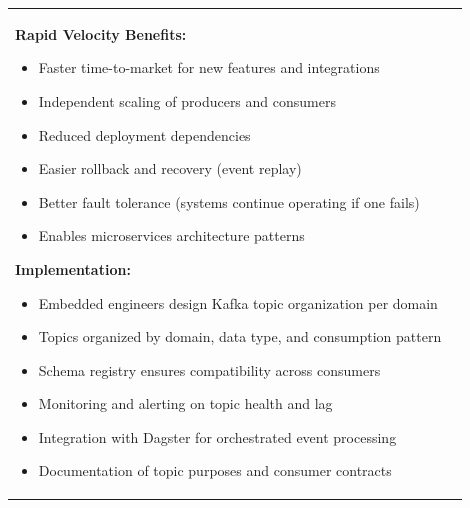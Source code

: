 \documentclass[10pt, a4paper]{article}
\begin{document}
{\begin{tabular}[t]{@{}p{}@{\hspace{0.02\textwidth}}p{}@{}}
\vspace{0.1em}

\textbf{Rapid Velocity Benefits:}
\begin{itemize}[leftmargin=1em, itemsep=0.05em]
    \item Faster time-to-market for new features and integrations
    \item Independent scaling of producers and consumers
    \item Reduced deployment dependencies
    \item Easier rollback and recovery (event replay)
    \item Better fault tolerance (systems continue operating if one fails)
    \item Enables microservices architecture patterns
\end{itemize}

\vspace{0.1em}

\textbf{Implementation:}
\begin{itemize}[leftmargin=1em, itemsep=0.05em]
    \item Embedded engineers design Kafka topic organization per domain
    \item Topics organized by domain, data type, and consumption pattern
    \item Schema registry ensures compatibility across consumers
    \item Monitoring and alerting on topic health and lag
    \item Integration with Dagster for orchestrated event processing
    \item Documentation of topic purposes and consumer contracts
\end{itemize}

\end{tabular}
}

\newpage


\vspace{0.1em}
\end{document}
